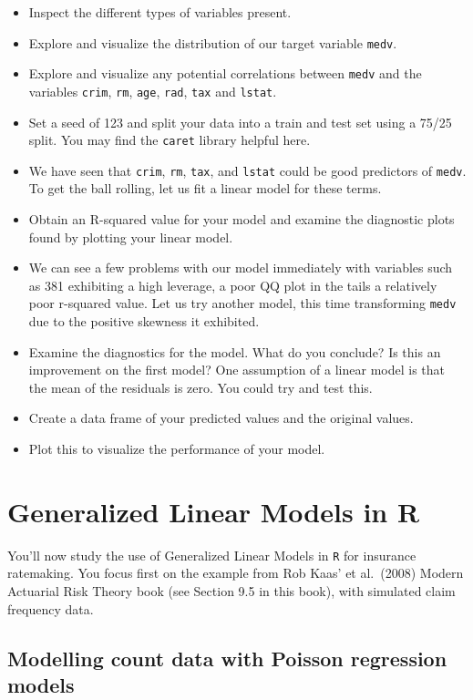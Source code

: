\documentclass[
]{book}
\providecommand{\tightlist}{%
  \setlength{\itemsep}{0pt}\setlength{\parskip}{0pt}}
\begin{document}
\begin{itemize}
\tightlist
\item
  Inspect the different types of variables present.
\item
  Explore and visualize the distribution of our target variable \texttt{medv}.
\item
  Explore and visualize any potential correlations between \texttt{medv} and the variables \texttt{crim}, \texttt{rm}, \texttt{age}, \texttt{rad}, \texttt{tax} and \texttt{lstat}.
\item
  Set a seed of 123 and split your data into a train and test set using a 75/25 split. You may find the \texttt{caret} library helpful here.
\item
  We have seen that \texttt{crim}, \texttt{rm}, \texttt{tax}, and \texttt{lstat} could be good predictors of \texttt{medv}. To get the ball rolling, let us fit a linear model for these terms.
\item
  Obtain an R-squared value for your model and examine the diagnostic plots found by plotting your linear model.
\item
  We can see a few problems with our model immediately with variables such as 381 exhibiting a high leverage, a poor QQ plot in the tails a relatively poor r-squared value. Let us try another model, this time transforming \texttt{medv} due to the positive skewness it exhibited.
\item
  Examine the diagnostics for the model. What do you conclude? Is this an improvement on the first model?
  One assumption of a linear model is that the mean of the residuals is zero. You could try and test this.
\item
  Create a data frame of your predicted values and the original values.
\item
  Plot this to visualize the performance of your model.
\end{itemize}

\hypertarget{glms}{%
\chapter{Generalized Linear Models in R}\label{glms}}

You'll now study the use of Generalized Linear Models in \texttt{R} for insurance ratemaking. You focus first on the example from Rob Kaas' et al.~(2008) Modern Actuarial Risk Theory book (see Section 9.5 in this book), with simulated claim frequency data.

\hypertarget{modelling-count-data-with-poisson-regression-models}{%
\section{Modelling count data with Poisson regression models}\label{modelling-count-data-with-poisson-regression-models}}
\end{document}
